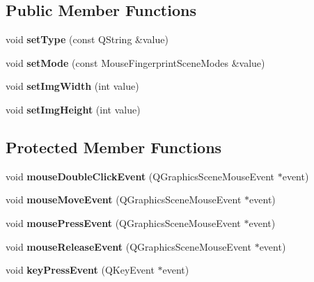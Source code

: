 \subsection*{Public Member Functions}
\begin{DoxyCompactItemize}
\item 
\mbox{\label{class_mouse_fingerprint_scene_acfb42d8c65f30bb29997e52b57d81e6f}} 
void {\bfseries set\+Type} (const Q\+String \&value)
\item 
\mbox{\label{class_mouse_fingerprint_scene_ae1dfc506636475bcde349ef2e68e7926}} 
void {\bfseries set\+Mode} (const Mouse\+Fingerprint\+Scene\+Modes \&value)
\item 
\mbox{\label{class_mouse_fingerprint_scene_ab63f9b28cd8188fe04d6af3d6be9c2a5}} 
void {\bfseries set\+Img\+Width} (int value)
\item 
\mbox{\label{class_mouse_fingerprint_scene_a3c233ce2942dbe1a01107bcffa55843d}} 
void {\bfseries set\+Img\+Height} (int value)
\end{DoxyCompactItemize}
\subsection*{Protected Member Functions}
\begin{DoxyCompactItemize}
\item 
\mbox{\label{class_mouse_fingerprint_scene_a9f2f7e8bd89075fc410559488603f987}} 
void {\bfseries mouse\+Double\+Click\+Event} (Q\+Graphics\+Scene\+Mouse\+Event $\ast$event)
\item 
\mbox{\label{class_mouse_fingerprint_scene_a2191bf09be0b920cf51c56cdb7c827b9}} 
void {\bfseries mouse\+Move\+Event} (Q\+Graphics\+Scene\+Mouse\+Event $\ast$event)
\item 
\mbox{\label{class_mouse_fingerprint_scene_a57fa9080034208eb571d5e8dc73c3faf}} 
void {\bfseries mouse\+Press\+Event} (Q\+Graphics\+Scene\+Mouse\+Event $\ast$event)
\item 
\mbox{\label{class_mouse_fingerprint_scene_aafd6f4e73d8ca89e952174a7b37a8ded}} 
void {\bfseries mouse\+Release\+Event} (Q\+Graphics\+Scene\+Mouse\+Event $\ast$event)
\item 
\mbox{\label{class_mouse_fingerprint_scene_aca6ac6bad36ad67ff8a11c48db3569ee}} 
void {\bfseries key\+Press\+Event} (Q\+Key\+Event $\ast$event)
\end{DoxyCompactItemize}


